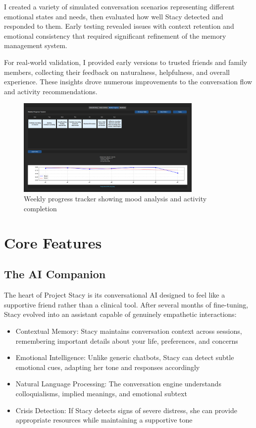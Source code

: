 \documentclass[12pt]{article}
\begin{document}
I created a variety of simulated conversation scenarios representing different emotional states and needs, then evaluated how well Stacy detected and responded to them. Early testing revealed issues with context retention and emotional consistency that required significant refinement of the memory management system.

For real-world validation, I provided early versions to trusted friends and family members, collecting their feedback on naturalness, helpfulness, and overall experience. These insights drove numerous improvements to the conversation flow and activity recommendations.

\begin{figure}[H]
  \centering
  \includegraphics[width=0.8\textwidth]{../images/Progress-Tracker.png}
  \caption{Weekly progress tracker showing mood analysis and activity completion}
\end{figure}

\section{Core Features}

\subsection{The AI Companion}

The heart of Project Stacy is its conversational AI designed to feel like a supportive friend rather than a clinical tool. After several months of fine-tuning, Stacy evolved into an assistant capable of genuinely empathetic interactions:

\begin{itemize}
    \item Contextual Memory: Stacy maintains conversation context across sessions, remembering important details about your life, preferences, and concerns
    \item Emotional Intelligence: Unlike generic chatbots, Stacy can detect subtle emotional cues, adapting her tone and responses accordingly
    \item Natural Language Processing: The conversation engine understands colloquialisms, implied meanings, and emotional subtext
    \item Crisis Detection: If Stacy detects signs of severe distress, she can provide appropriate resources while maintaining a supportive tone
\end{itemize}
\end{document}
